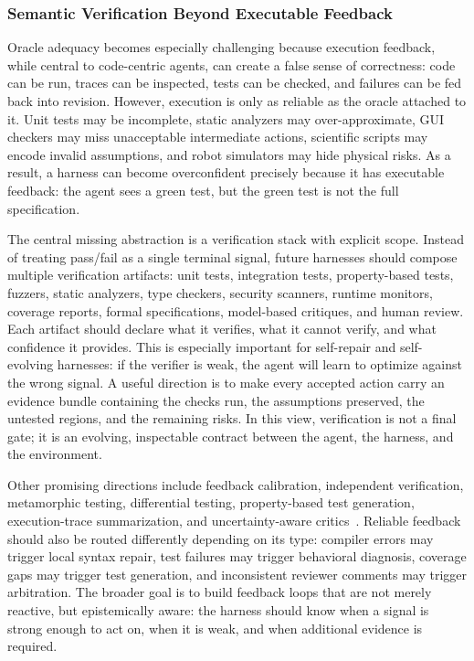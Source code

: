 \subsubsection{Semantic Verification Beyond Executable Feedback}

Oracle adequacy becomes especially challenging because execution feedback, while central to code-centric agents, can create a false sense of correctness: code can be run, traces can be inspected, tests can be checked, and failures can be fed back into revision. However, execution is only as reliable as the oracle attached to it. Unit tests may be incomplete, static analyzers may over-approximate, GUI checkers may miss unacceptable intermediate actions, scientific scripts may encode invalid assumptions, and robot simulators may hide physical risks. As a result, a harness can become overconfident precisely because it has executable feedback: the agent sees a green test, but the green test is not the full specification.

The central missing abstraction is a verification stack with explicit scope. Instead of treating pass/fail as a single terminal signal, future harnesses should compose multiple verification artifacts: unit tests, integration tests, property-based tests, fuzzers, static analyzers, type checkers, security scanners, runtime monitors, coverage reports, formal specifications, model-based critiques, and human review. Each artifact should declare what it verifies, what it cannot verify, and what confidence it provides. This is especially important for self-repair and self-evolving harnesses: if the verifier is weak, the agent will learn to optimize against the wrong signal. A useful direction is to make every accepted action carry an evidence bundle containing the checks run, the assumptions preserved, the untested regions, and the remaining risks. In this view, verification is not a final gate; it is an evolving, inspectable contract between the agent, the harness, and the environment.

Other promising directions include feedback calibration, independent verification, metamorphic testing, differential testing, property-based test generation, execution-trace summarization, and uncertainty-aware critics~\citep{ni2023lever,jung-etal-2025-code,tang2026execverify}. Reliable feedback should also be routed differently depending on its type: compiler errors may trigger local syntax repair, test failures may trigger behavioral diagnosis, coverage gaps may trigger test generation, and inconsistent reviewer comments may trigger arbitration. The broader goal is to build feedback loops that are not merely reactive, but epistemically aware: the harness should know when a signal is strong enough to act on, when it is weak, and when additional evidence is required.


